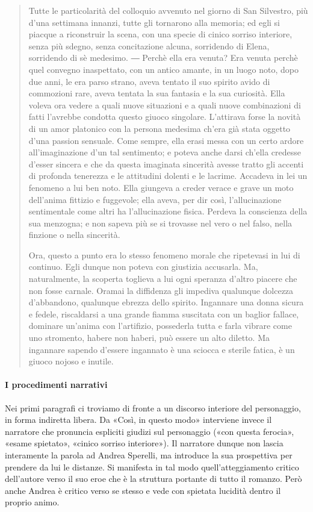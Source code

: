 \documentclass{book}
\begin{document}
\begin{quote}
Tutte le particolarità del colloquio avvenuto nel giorno di San Silvestro, più d’una settimana innanzi, tutte gli tornarono alla memoria; ed egli si piacque a riconstruir la scena, con una specie di cinico sorriso interiore, senza più sdegno, senza concitazione alcuna, sorridendo di Elena, sorridendo di sè medesimo. ― Perchè ella era venuta? Era venuta perchè quel convegno inaspettato, con un antico amante, in un luogo noto, dopo due anni, le era parso strano, aveva tentato il suo spirito avido di commozioni rare, aveva tentata la sua fantasia e la sua curiosità. Ella voleva ora vedere a quali nuove situazioni e a quali nuove combinazioni di fatti l’avrebbe condotta questo giuoco singolare. L’attirava forse la novità di un amor platonico con la persona medesima ch’era già stata oggetto d’una passion sensuale. Come sempre, ella erasi messa con un certo ardore all’imaginazione d’un tal sentimento; e poteva anche darsi ch’ella credesse d’esser sincera e che da questa imaginata sincerità avesse tratto gli accenti di profonda tenerezza e le attitudini dolenti e le lacrime. Accadeva in lei un fenomeno a lui ben noto. Ella giungeva a creder verace e grave un moto dell’anima fittizio e fuggevole; ella aveva, per dir così, l’allucinazione sentimentale come altri ha l’allucinazione fisica. Perdeva la conscienza della sua menzogna; e non sapeva più se si trovasse nel vero o nel falso, nella finzione o nella sincerità.

Ora, questo a punto era lo stesso fenomeno morale che ripetevasi in lui di continuo. Egli dunque non poteva con giustizia accusarla. Ma, naturalmente, la scoperta toglieva a lui ogni speranza d’altro piacere che non fosse carnale. Oramai la diffidenza gli impediva qualunque dolcezza d’abbandono, qualunque ebrezza dello spirito. Ingannare una donna sicura e fedele, riscaldarsi a una grande fiamma suscitata con un baglior fallace, dominare un’anima con l’artifizio, possederla tutta e farla vibrare come uno stromento, habere non haberi, può essere un alto diletto. Ma ingannare sapendo d’essere ingannato è una sciocca e sterile fatica, è un giuoco nojoso e inutile.
\end{quote}

\paragraph{I procedimenti narrativi} Nei primi paragrafi ci troviamo di fronte a un discorso interiore del personaggio, in forma indiretta libera. Da «Così, in questo modo» interviene invece il narratore che pronuncia espliciti giudizi sul personaggio («con questa ferocia», «esame spietato», «cinico sorriso interiore»). Il narratore dunque non lascia interamente la parola ad Andrea Sperelli, ma introduce la sua prospettiva per prendere da lui le distanze. Si manifesta in tal modo quell'atteggiamento critico dell'autore verso il suo eroe che è la struttura portante di tutto il romanzo. Però
anche Andrea è critico verso se stesso e vede con spietata lucidità dentro il proprio animo.
\end{document}
